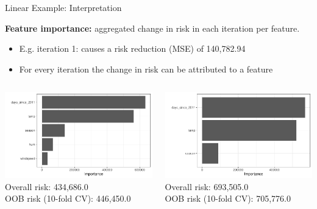 \documentclass[11pt,compress,t,notes=noshow, aspectratio=169, xcolor=table]{beamer}
\begin{document}
\begin{frame}{Linear Example: Interpretation}

\medskip
\textbf{Feature importance:} aggregated change in risk in each iteration per feature. 
\begin{itemize}
    \item E.g. iteration 1:  causes a risk reduction (MSE) of 140,782.94
    \item For every iteration the change in risk can be attributed to a feature
\end{itemize}
\medskip

\begin{columns}[T, totalwidth=\linewidth]
\begin{column}{0.47\linewidth}
\includegraphics[width = \linewidth]{figure/compboost_pfi_base2.pdf}\\
\centering \scriptsize
Overall risk: 434,686.0 \\
OOB risk (10-fold CV): 446,450.0
\end{column}


\begin{column}{0.47\linewidth}
\includegraphics[width = \linewidth]{figure/compboost_pfi_base1.pdf}\\
\centering \scriptsize
Overall risk: 693,505.0\\
OOB risk (10-fold CV): 705,776.0
\end{column}
\end{columns}


\end{frame}
\end{document}
